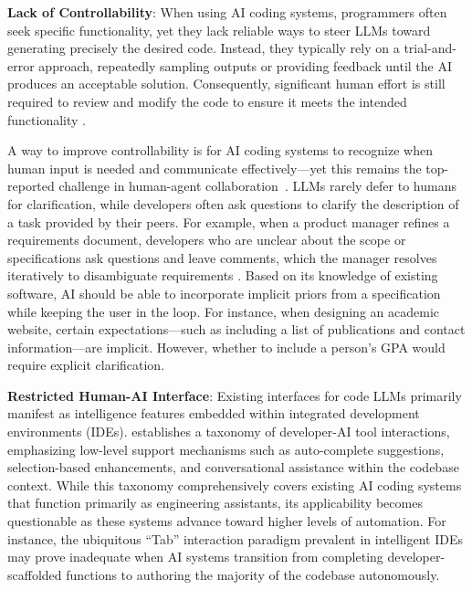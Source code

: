

\textbf{Lack of Controllability}: When using AI coding systems, programmers often seek specific functionality, yet they lack reliable ways to steer LLMs toward generating precisely the desired code. Instead, they typically rely on a trial-and-error approach, repeatedly sampling outputs or providing feedback until the AI produces an acceptable solution. Consequently, significant human effort is still required to review and modify the code to ensure it meets the intended functionality \citep{weisz2024examining}.

A way to improve controllability is for AI coding systems to recognize when human input is needed and communicate effectively—yet this remains the top-reported challenge in human-agent collaboration~\citep{shao2024collaborative}. LLMs rarely defer to humans for clarification, while developers often ask questions to clarify the description of a task provided by their peers. For example, when a product manager refines a requirements document, developers who are unclear about the scope or specifications ask questions and leave comments, which the manager resolves iteratively to disambiguate requirements \citep{nahar2022collaboration}. Based on its knowledge of existing software, AI should be able to incorporate implicit priors from a specification while keeping the user in the loop. For instance, when designing an academic website, certain expectations—such as including a list of publications and contact information—are implicit. However, whether to include a person’s GPA would require explicit clarification.

\textbf{Restricted Human-AI Interface}: Existing interfaces for code LLMs primarily manifest as intelligence features embedded within integrated development environments (IDEs). \citet{treude2025developers} establishes a taxonomy of developer-AI tool interactions, emphasizing low-level support mechanisms such as auto-complete suggestions, selection-based enhancements, and conversational assistance within the codebase context. While this taxonomy comprehensively covers existing AI coding systems that function primarily as engineering assistants, its applicability becomes questionable as these systems advance toward higher levels of automation. For instance, the ubiquitous ``Tab'' interaction paradigm prevalent in intelligent IDEs may prove inadequate when AI systems transition from completing developer-scaffolded functions to authoring the majority of the codebase autonomously.

